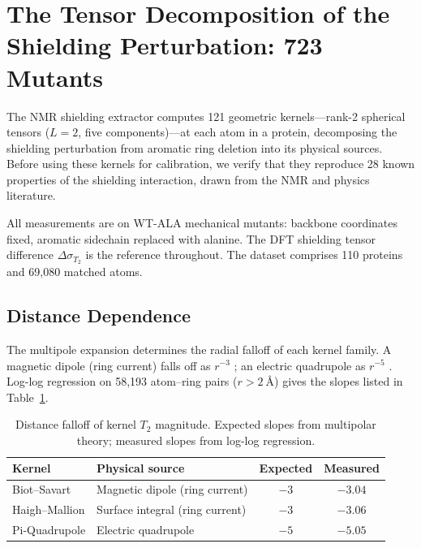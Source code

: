 
\section{The Tensor Decomposition of the Shielding Perturbation: 723 Mutants}
\label{sec:tensor-decomposition}

The NMR shielding extractor computes 121 geometric kernels---rank-2
spherical tensors ($L=2$, five components)---at each atom in a protein,
decomposing the shielding perturbation from aromatic ring deletion into
its physical sources.  Before using these kernels for calibration, we
verify that they reproduce 28 known properties of the shielding
interaction, drawn from the NMR and physics literature.

All measurements are on WT-ALA mechanical mutants: backbone coordinates
fixed, aromatic sidechain replaced with alanine.  The DFT shielding
tensor difference $\Delta\sigma_{T_2}$ is the reference throughout.
The dataset comprises 110 proteins and 69{,}080 matched atoms.


\subsection{Distance Dependence}
\label{ssec:distance}

The multipole expansion determines the radial falloff of each kernel
family.  A magnetic dipole (ring current) falls off as $r^{-3}$
\cite{johnson1958}; an electric quadrupole as $r^{-5}$
\cite{stone2013}.  Log-log regression on 58{,}193 atom--ring pairs
($r > \SI{2}{\angstrom}$) gives the slopes listed in
Table~\ref{tab:distance-slopes}.

\begin{table}[htbp]
  \centering
  \caption{Distance falloff of kernel $T_2$ magnitude.  Expected slopes
    from multipolar theory; measured slopes from log-log regression.}
  \label{tab:distance-slopes}
  \begin{tabular}{llcc}
    \toprule
    Kernel & Physical source & Expected & Measured \\
    \midrule
    Biot--Savart    & Magnetic dipole (ring current) & $-3$ & $-3.04$ \\
    Haigh--Mallion  & Surface integral (ring current) & $-3$ & $-3.06$ \\
    Pi-Quadrupole   & Electric quadrupole             & $-5$ & $-5.05$ \\
    \bottomrule
  \end{tabular}
\end{table}

